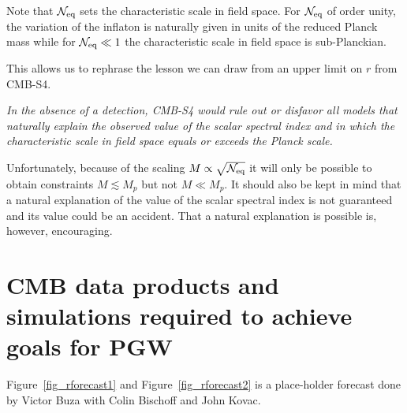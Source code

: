Note that $\mathcal{N}_{\rm eq}$ sets the characteristic scale in field space. For $\mathcal{N}_{\rm eq}$ of order unity, the variation of the inflaton is naturally given in units of the reduced Planck mass while for $\mathcal{N}_{\rm eq}\ll 1$ the characteristic scale in field space is sub-Planckian. 

This allows us to rephrase the lesson we can draw from an upper limit on $r$ from CMB-S4.

{\em In the absence of a detection, CMB-S4 would rule out or disfavor all models that naturally explain the observed value of the scalar spectral index and in which the characteristic scale in field space equals or exceeds the Planck scale.}

Unfortunately, because of the scaling $M\propto \sqrt{\mathcal{N}_{\rm eq}}$ it will only be possible to obtain constraints $M\lesssim M_p$ but not $M\ll M_p$. It should also be kept in mind that a natural explanation of the value of the scalar spectral index is not guaranteed and its value could be an accident. That a natural explanation is possible is, however, encouraging.

\section{CMB data products and simulations required to achieve goals for PGW}
\label{sec:needs}

Figure~\ref{fig_rforecast1} and Figure~\ref{fig_rforecast2} is a place-holder forecast done by Victor Buza with Colin Bischoff and John Kovac.

